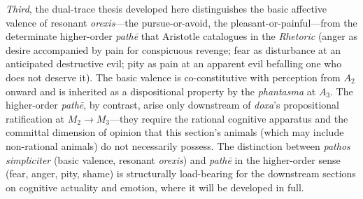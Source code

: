 \documentclass[12pt]{article}
\begin{document}
\textit{Third}, the dual-trace thesis developed here distinguishes the basic affective valence of resonant \textit{orexis}---the pursue-or-avoid, the pleasant-or-painful---from the determinate higher-order \textit{pathē} that Aristotle catalogues in the \textit{Rhetoric} (anger as desire accompanied by pain for conspicuous revenge; fear as disturbance at an anticipated destructive evil; pity as pain at an apparent evil befalling one who does not deserve it). The basic valence is co-constitutive with perception from $A_2$ onward and is inherited as a dispositional property by the \textit{phantasma} at $A_3$. The higher-order \textit{pathē}, by contrast, arise only downstream of \textit{doxa}'s propositional ratification at $M_2 \to M_3$---they require the rational cognitive apparatus and the committal dimension of opinion that this section's animals (which may include non-rational animals) do not necessarily possess. The distinction between \textit{pathos simpliciter} (basic valence, resonant \textit{orexis}) and \textit{pathē} in the higher-order sense (fear, anger, pity, shame) is structurally load-bearing for the downstream sections on cognitive actuality and emotion, where it will be developed in full.
\end{document}
